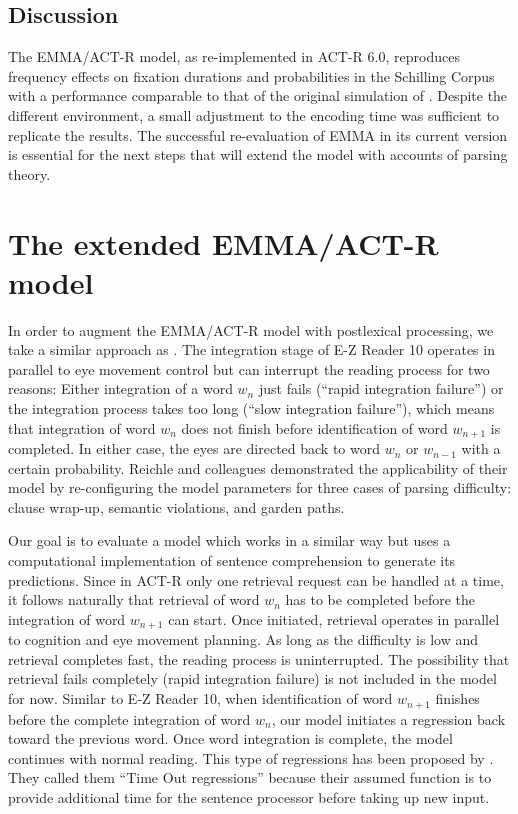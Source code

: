 \subsection{Discussion}
The EMMA/ACT-R model, as re-implemented in ACT-R 6.0, reproduces frequency effects on fixation durations and probabilities in the Schilling Corpus with a performance comparable to that of the original simulation of \cite{Salvucci2001}.  Despite the different environment, a small adjustment to the encoding time was sufficient to replicate the results.  
The successful re-evaluation of EMMA in its current version is essential for the next steps that will extend the model with accounts of parsing theory.

\section{The extended EMMA/ACT-R model}
In order to augment the EMMA/ACT-R model with postlexical processing, we take a similar approach as \cite{ReichleWarrenMcConnell2009}.  The integration stage of E-Z Reader 10 operates in parallel to eye movement control but can interrupt the reading process for two reasons: Either integration of a word $w_n$ just fails (``rapid integration failure'') or the integration process takes too long (``slow integration failure''), which means that integration of word $w_n$ does not finish before identification of word $w_{n+1}$ is completed.
In either case, the eyes are directed back to word $w_n$ or $w_{n-1}$ with a certain probability.  
Reichle and colleagues demonstrated the applicability of their model by re-configuring the model parameters for three cases of parsing difficulty: clause wrap-up, semantic violations, and garden paths. 

Our goal is to evaluate a model which works in a similar way but uses a computational implementation of sentence comprehension to generate its predictions. 
Since in ACT-R only one retrieval request can be handled at a time, it follows naturally that retrieval of word $w_{n}$ has to be completed before the integration of word $w_{n+1}$ can start.  Once initiated, retrieval operates in parallel to cognition and eye movement planning. As long as the difficulty is low and retrieval completes fast, the reading process is uninterrupted.  The possibility that retrieval fails completely (rapid integration failure) is not included in the model for now.
Similar to E-Z Reader 10, when identification of word $w_{n+1}$ finishes before the complete integration of word $w_n$, our model initiates a regression back toward the previous word.  Once word integration is complete, the model continues with normal reading.  This type of regressions has been proposed by \cite{MitchellEtAl2008}.  They called them  ``Time Out regressions'' because their assumed function is to provide additional time for the sentence processor before taking up new input.

